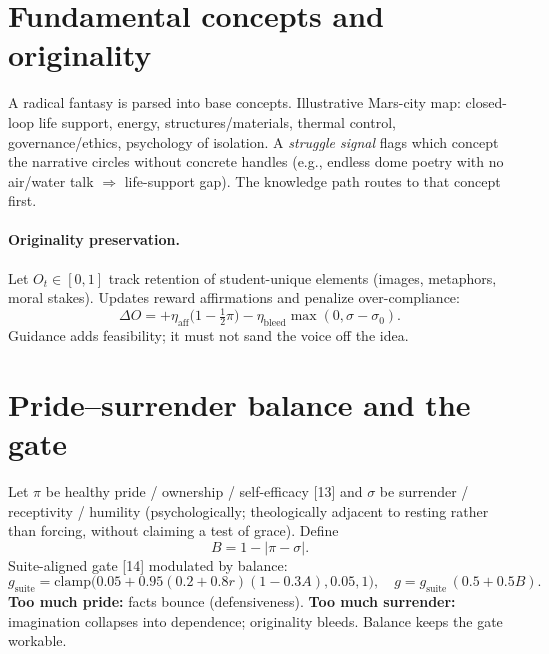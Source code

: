 \documentclass[11pt, a4paper]{article}
\begin{document}
\section{Fundamental concepts and originality}
A radical fantasy is parsed into base concepts. Illustrative Mars-city map: closed-loop life support, energy, structures/materials, thermal control, governance/ethics, psychology of isolation. A \emph{struggle signal} flags which concept the narrative circles without concrete handles (e.g., endless dome poetry with no air/water talk $\Rightarrow$ life-support gap). The knowledge path routes to that concept first.

\paragraph{Originality preservation.}
Let $O_t\in[0,1]$ track retention of student-unique elements (images, metaphors, moral stakes). Updates reward affirmations and penalize over-compliance:
\begin{equation}
\Delta O = +\eta_{\mathrm{aff}}\big(1-\tfrac{1}{2}\pi\big) - \eta_{\mathrm{bleed}}\max(0,\sigma-\sigma_0).
\end{equation}
Guidance adds feasibility; it must not sand the voice off the idea.

\section{Pride--surrender balance and the gate}
Let $\pi$ be healthy pride / ownership / self-efficacy [13] and $\sigma$ be surrender / receptivity / humility (psychologically; theologically adjacent to resting rather than forcing, without claiming a test of grace). Define
\begin{equation}
B = 1 - |\pi - \sigma|.
\end{equation}
Suite-aligned gate [14] modulated by balance:
\begin{equation}
g_{\mathrm{suite}}=\mathrm{clamp}\big(0.05+0.95(0.2+0.8r)(1-0.3A),0.05,1\big),\quad
g = g_{\mathrm{suite}}\,(0.5+0.5B).
\end{equation}
\textbf{Too much pride:} facts bounce (defensiveness). \textbf{Too much surrender:} imagination collapses into dependence; originality bleeds. Balance keeps the gate workable.
\end{document}
